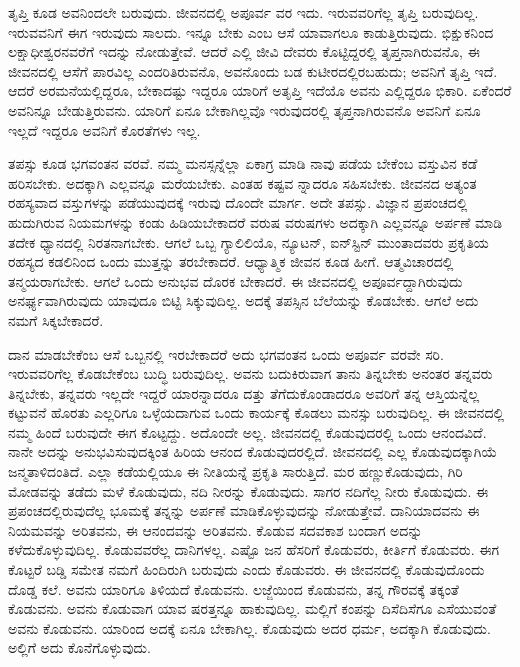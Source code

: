 ತೃಪ್ತಿ ಕೂಡ ಅವನಿಂದಲೇ ಬರುವುದು. ಜೀವನದಲ್ಲಿ ಅಪೂರ್ವ ವರ ಇದು. ಇರುವವರಿಗೆಲ್ಲ ತೃಪ್ತಿ ಬರುವುದಿಲ್ಲ. ಇರುವವನಿಗೆ ಈಗ ಇರುವುದು ಸಾಲದು. ಇನ್ನೂ ಬೇಕು ಎಂಬ ಆಸೆ ಯಾವಾಗಲೂ ಕಾಡುತ್ತಿರುವುದು. ಭಿಕ್ಷುಕನಿಂದ ಲಕ್ಷಾಧೀಶ್ವರನವರೆಗೆ ಇದನ್ನು ನೋಡುತ್ತೇವೆ. ಆದರೆ ಎಲ್ಲಿ ಜೀವಿ ದೇವರು ಕೊಟ್ಟಿದ್ದರಲ್ಲಿ ತೃಪ್ತನಾಗಿರುವನೊ, ಈ ಜೀವನದಲ್ಲಿ ಆಸೆಗೆ ಪಾರವಿಲ್ಲ ಎಂದರಿತಿರುವನೊ, ಅವನೊಂದು ಬಡ ಕುಟೀರದಲ್ಲಿರಬಹುದು; ಅವನಿಗೆ ತೃಪ್ತಿ ಇದೆ. ಆದರೆ ಅರಮನೆಯಲ್ಲಿದ್ದರೂ, ಬೇಕಾದಷ್ಟು ಇದ್ದರೂ ಯಾರಿಗೆ ಅತೃಪ್ತಿ ಇದೆಯೊ ಅವನು ಎಲ್ಲಿದ್ದರೂ ಭಿಕಾರಿ. ಏಕೆಂದರೆ ಅವನಿನ್ನೂ ಬೇಡುತ್ತಿರುವನು. ಯಾರಿಗೆ ಏನೂ ಬೇಕಾಗಿಲ್ಲವೊ ಇರುವುದರಲ್ಲಿ ತೃಪ್ತನಾಗಿರುವನೊ ಅವನಿಗೆ ಏನೂ ಇಲ್ಲದೆ ಇದ್ದರೂ ಅವನಿಗೆ ಕೊರತೆಗಳು ಇಲ್ಲ.

ತಪಸ್ಸು ಕೂಡ ಭಗವಂತನ ವರವೆ. ನಮ್ಮ ಮನಸ್ಸನ್ನೆಲ್ಲಾ ಏಕಾಗ್ರ ಮಾಡಿ ನಾವು ಪಡೆಯ ಬೇಕೆಂಬ ವಸ್ತುವಿನ ಕಡೆ ಹರಿಸಬೇಕು. ಅದಕ್ಕಾಗಿ ಎಲ್ಲವನ್ನೂ ಮರೆಯಬೇಕು. ಎಂತಹ ಕಷ್ಟವ ನ್ನಾದರೂ ಸಹಿಸಬೇಕು. ಜೀವನದ ಅತ್ಯಂತ ರಹಸ್ಯವಾದ ವಸ್ತುಗಳನ್ನು ಪಡೆಯುವುದಕ್ಕೆ ಇರುವು ದೊಂದೇ ಮಾರ್ಗ. ಅದೇ ತಪಸ್ಸು. ವಿಜ್ಞಾನ ಪ್ರಪಂಚದಲ್ಲಿ ಹುದುಗಿರುವ ನಿಯಮಗಳನ್ನು ಕಂಡು ಹಿಡಿಯಬೇಕಾದರೆ ವರುಷ ವರುಷಗಳು ಅದಕ್ಕಾಗಿ ಎಲ್ಲವನ್ನೂ ಅರ್ಪಣೆ ಮಾಡಿ ತದೇಕ ಧ್ಯಾನದಲ್ಲಿ ನಿರತನಾಗಬೇಕು. ಆಗಲೆ ಒಬ್ಬ ಗ್ಯಾಲಿಲಿಯೊ, ನ್ಯೂಟನ್, ಐನ್​ಸ್ಟಿನ್ ಮುಂತಾದವರು ಪ್ರಕೃತಿಯ ರಹಸ್ಯದ ಕಡಲಿನಿಂದ ಒಂದು ಮುತ್ತನ್ನು ತರಬೇಕಾದರೆ. ಆಧ್ಯಾತ್ಮಿಕ ಜೀವನ ಕೂಡ ಹೀಗೆ. ಆತ್ಮವಿಚಾರದಲ್ಲಿ ತನ್ಮಯರಾಗಬೇಕು. ಆಗಲೆ ಒಂದು ಅನುಭವ ದೊರಕ ಬೇಕಾದರೆ. ಈ ಜೀವನದಲ್ಲಿ ಅಪೂರ್ವದ್ದಾಗಿರುವುದು ಅನರ್ಘ್ಯವಾಗಿರುವುದು ಯಾವುದೂ ಬಿಟ್ಟಿ ಸಿಕ್ಕುವುದಿಲ್ಲ. ಅದಕ್ಕೆ ತಪಸ್ಸಿನ ಬೆಲೆಯನ್ನು ಕೊಡಬೇಕು. ಆಗಲೆ ಅದು ನಮಗೆ ಸಿಕ್ಕಬೇಕಾದರೆ.

ದಾನ ಮಾಡಬೇಕೆಂಬ ಆಸೆ ಒಬ್ಬನಲ್ಲಿ ಇರಬೇಕಾದರೆ ಅದು ಭಗವಂತನ ಒಂದು ಅಪೂರ್ವ ವರವೇ ಸರಿ. ಇರುವವರಿಗೆಲ್ಲ ಕೊಡಬೇಕೆಂಬ ಬುದ್ಧಿ ಬರುವುದಿಲ್ಲ. ಅವನು ಬದುಕಿರುವಾಗ ತಾನು ತಿನ್ನಬೇಕು ಅನಂತರ ತನ್ನವರು ತಿನ್ನಬೇಕು, ತನ್ನವರು ಇಲ್ಲದೇ ಇದ್ದರೆ ಯಾರನ್ನಾದರೂ ದತ್ತು ತೆಗೆದುಕೊಂಡಾದರೂ ಅವರಿಗೆ ತನ್ನ ಆಸ್ತಿಯನ್ನೆಲ್ಲ ಕಟ್ಟುವನೆ ಹೊರತು ಎಲ್ಲರಿಗೂ ಒಳ್ಳೆಯ\-ದಾಗುವ ಒಂದು ಕಾರ್ಯಕ್ಕೆ ಕೊಡಲು ಮನಸ್ಸು ಬರುವುದಿಲ್ಲ. ಈ ಜೀವನದಲ್ಲಿ ನಮ್ಮ ಹಿಂದೆ ಬರುವುದೇ ಈಗ ಕೊಟ್ಟದ್ದು. ಅದೊಂದೇ ಅಲ್ಲ. ಜೀವನದಲ್ಲಿ ಕೊಡುವುದರಲ್ಲಿ ಒಂದು ಆನಂದವಿದೆ. ನಾನೇ ಅದನ್ನು ಅನುಭವಿಸುವುದಕ್ಕಿಂತ ಹಿರಿಯ ಆನಂದ ಕೊಡುವುದರಲ್ಲಿದೆ. ಜೀವನದಲ್ಲಿ ಎಲ್ಲ ಕೊಡುವುದಕ್ಕಾಗಿಯೆ ಜನ್ಮತಾಳಿದಂತಿದೆ. ಎಲ್ಲಾ ಕಡೆಯಲ್ಲಿಯೂ ಈ ನೀತಿಯನ್ನೆ ಪ್ರಕೃತಿ ಸಾರುತ್ತಿದೆ. ಮರ ಹಣ್ಣುಕೊಡುವುದು, ಗಿರಿ ಮೋಡವನ್ನು ತಡೆದು ಮಳೆ ಕೊಡುವುದು, ನದಿ ನೀರನ್ನು ಕೊಡುವುದು. ಸಾಗರ ನದಿಗೆಲ್ಲ ನೀರು ಕೊಡುವುದು. ಈ ಪ್ರಪಂಚದಲ್ಲಿರುವುದೆಲ್ಲ ಭೂಮಕ್ಕೆ ತನ್ನನ್ನು ಅರ್ಪಣೆ ಮಾಡಿಕೊಳ್ಳುವುದನ್ನು ನೋಡುತ್ತೇವೆ. ದಾನಿಯಾದವನು ಈ ನಿಯಮವನ್ನು ಅರಿತವನು, ಈ ಆನಂದವನ್ನು ಅರಿತವನು. ಕೊಡುವ ಸದವಕಾಶ ಬಂದಾಗ ಅದನ್ನು ಕಳೆದುಕೊಳ್ಳುವುದಿಲ್ಲ. ಕೊಡುವವರೆಲ್ಲ ದಾನಿಗಳಲ್ಲ. ಎಷ್ಟೊ ಜನ ಹೆಸರಿಗೆ ಕೊಡುವರು, ಕೀರ್ತಿಗೆ ಕೊಡುವರು. ಈಗ ಕೊಟ್ಟರೆ ಬಡ್ಡಿ ಸಮೇತ ನಮಗೆ ಹಿಂದಿರುಗಿ ಬರುವುದು ಎಂದು ಕೊಡುವರು. ಈ ಜೀವನದಲ್ಲಿ ಕೊಡುವುದೊಂದು ದೊಡ್ಡ ಕಲೆ. ಅವನು ಯಾರಿಗೂ ತಿಳಿಯದೆ ಕೊಡುವನು. ಲಜ್ಜೆಯಿಂದ ಕೊಡುವನು, ತನ್ನ ಗೌರವಕ್ಕೆ ತಕ್ಕಂತೆ ಕೊಡುವನು. ಅವನು ಕೊಡುವಾಗ ಯಾವ ಷರತ್ತನ್ನೂ ಹಾಕುವುದಿಲ್ಲ. ಮಲ್ಲಿಗೆ ಕಂಪನ್ನು ದಿಸೆದಿಸೆಗೂ ಎಸೆಯುವಂತೆ ಅವನು ಕೊಡುವನು. ಯಾರಿಂದ ಅದಕ್ಕೆ ಏನೂ ಬೇಕಾಗಿಲ್ಲ. ಕೊಡುವುದು ಅದರ ಧರ್ಮ, ಅದಕ್ಕಾಗಿ ಕೊಡುವುದು. ಅಲ್ಲಿಗೆ ಅದು ಕೊನೆಗೊಳ್ಳುವುದು.

